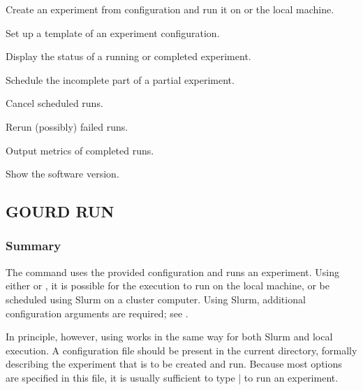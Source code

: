 \documentclass[a4paper,english]{article}
\begin{document}
\begin{adjustwidth}{18pt}{0pt}
        \begin{Description}[Commands]
            \item[\Prog{gourd} \Arg{run}]
            Create an experiment from configuration and run it on  or the local machine.
            \item[\Prog{gourd} \Arg{init}]
            Set up a template of an experiment configuration.
            \item[\Prog{gourd} \Arg{status}]
            Display the status of a running or completed experiment.
            \item[\Prog{gourd} \Arg{continue}]
            Schedule the incomplete part of a partial experiment.
            \item[\Prog{gourd} \Arg{cancel}]
            Cancel scheduled runs.
            \item[\Prog{gourd} \Arg{rerun}]
            Rerun (possibly) failed runs.
            \item[\Prog{gourd} \Arg{analyse}]
            Output metrics of completed runs.
            \item[\Prog{gourd} \Arg{version}]
            Show the software version.
        \end{Description}

        \subsection{GOURD RUN}

            \subsubsection{Summary}
                The   command uses the provided configuration and runs an
                experiment.
                Using either  or , it is possible for the execution
                to run on the local machine, or be scheduled using Slurm on a cluster computer.
                Using Slurm, additional configuration arguments are required; see
                .

                In principle, however, using   works in the same way for both
                Slurm and local execution.
                A  configuration file should be present in the current directory,
                formally describing the experiment that is to be created and run.
                Because most options are specified in this file, it is usually sufficient to type
                  | to run an experiment.


\end{adjustwidth}
\end{document}
